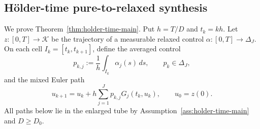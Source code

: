 \documentclass[twoside,11pt]{article}
\begin{document}
\subsection{H\"older-time pure-to-relaxed synthesis}
\label{app:holder-proof}

We prove Theorem~\ref{thm:holder-time-main}.  Put $h=T/D$ and
$t_k=kh$.  Let $z:[0,T]\to\mathcal K$ be the trajectory of a measurable
relaxed control $\alpha:[0,T]\to\Delta_J$.  On each cell
$I_k=[t_k,t_{k+1}]$, define the averaged control
\begin{equation}
 p_{k,j}:=\frac1h\int_{I_k}\alpha_j(s)\,ds,
 \qquad p_k\in\Delta_J,
 \label{eq:app-holder-average}
\end{equation}
and the mixed Euler path
\begin{equation}
 u_{k+1}=u_k+h\sum_{j=1}^Jp_{k,j}G_j(t_k,u_k),
 \qquad u_0=z(0).
 \label{eq:app-holder-mixed}
\end{equation}
All paths below lie in the enlarged tube by
Assumption~\ref{ass:holder-time-main} and $D\ge D_0$.
\end{document}
